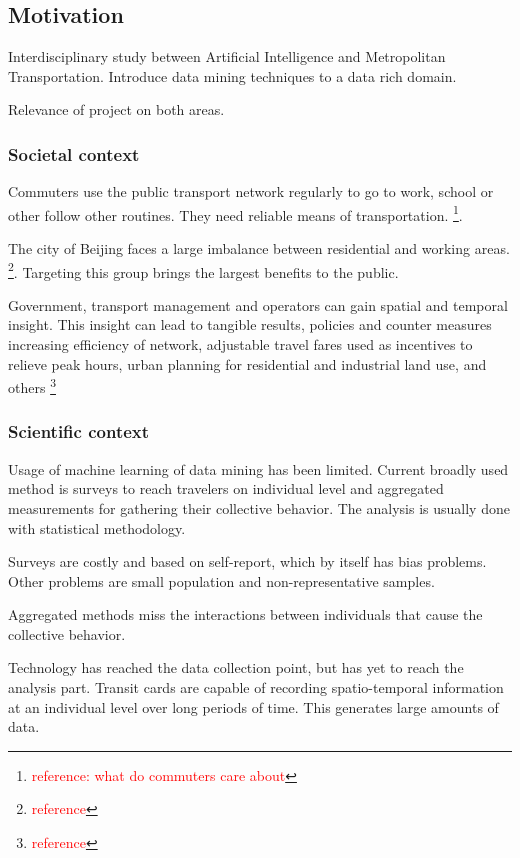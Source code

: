 \documentclass{article}
\newcommand{\selfnote}[1]{\footnote{\textcolor{red}{#1}}}
\begin{document}
\subsection{Motivation}
Interdisciplinary study between Artificial Intelligence and Metropolitan Transportation. Introduce data mining techniques to a data rich domain. 

Relevance of project on both areas. 

\subsubsection{Societal context}
Commuters use the public transport network regularly to go to work, school or other follow other routines. They need reliable means of transportation. \selfnote{reference: what do commuters care about}.

The city of Beijing faces a large imbalance between residential and working areas. \selfnote{reference}. Targeting this group brings the largest benefits to the public.  

Government, transport management and operators can gain spatial and temporal insight. This insight can lead to tangible results, policies and counter measures increasing efficiency of network, adjustable travel fares used as incentives to relieve peak hours, urban planning for residential and industrial land use, and others \selfnote{reference}

\subsubsection{Scientific context}
Usage of machine learning of data mining has been limited. Current broadly used method is surveys to reach travelers on individual level and aggregated measurements for gathering  their collective behavior. The analysis is usually done with statistical methodology. 

Surveys are costly and based on self-report, which by itself has bias problems. Other problems are small population and non-representative samples. 

Aggregated methods miss the interactions between individuals that cause the collective behavior. 

Technology has reached the data collection point, but has yet to reach the analysis part. Transit cards are capable of recording spatio-temporal information at an individual level over long periods of time. This generates large amounts of data. 
\end{document}
